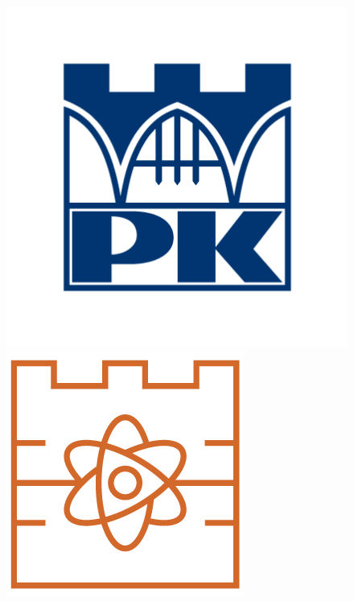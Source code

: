 \thispagestyle{empty}

\begin{figure}[!h]
\centering
\includegraphics[scale=0.22,trim={2.3cm 2cm 0 2cm},clip]{frontpage/PK_SYGNET_RGB.png}
\hfill
\includegraphics[scale=0.222,trim={0.1cm -0.12cm 0 0cm},clip]{frontpage/wimif.png}
\end{figure}

\vspace{-2.8cm}

